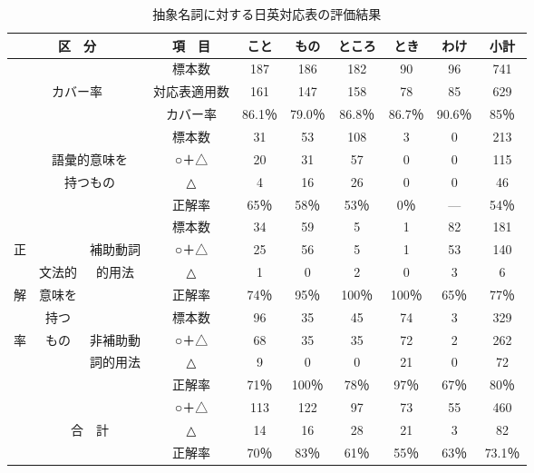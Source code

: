 \begin{table}[htbp]
\caption{抽象名詞に対する日英対応表の評価結果}
\begin{center}
\begin{tabular}{|c|c|c|c|c|c|c|c|c|c|} \hline
\multicolumn{3}{|c|}{区　分} & 項　目 & こと & もの & ところ & とき & わけ
 & 小計\\ \hline
\multicolumn{3}{|c|}{} & 標本数 & 187 & 186 & 182 & 90 & 96 & 741\\ \cline{4-10}
\multicolumn{3}{|c|}{カバー率} & 対応表適用数 & 161 & 147 & 158 & 78 &
 85 & 629\\ \cline{4-10}
\multicolumn{3}{|c|}{} & カバー率 & 86.1％ & 79.0％ & 86.8％ & 86.7％ &
 90.6％ & 85％\\ \hline
 & \multicolumn{2}{|c|}{} & 標本数 & 31 & 53 & 108 & 3 & 0 & 213\\ \cline{4-10}
 & \multicolumn{2}{|c|}{語彙的意味を} & ○＋△ & 20 & 31 & 57 & 0 & 0 &
 115\\ \cline{4-10}
 & \multicolumn{2}{|c|}{持つもの} & △ & 4 & 16 & 26 & 0 & 0 & 46\\ \cline{4-10}
 & \multicolumn{2}{|c|}{} & 正解率 & 65％ & 58％ & 53％ & 0％ & --- & 54％
 \\ \cline{2-10}
 & & & 標本数 & 34 & 59 & 5 & 1 & 82 & 181\\ \cline{4-10}
正 & & 補助動詞 & ○＋△ & 25 & 56 & 5 & 1 & 53 & 140\\ \cline{4-10}
 & 文法的 & 的用法 & △ & 1 & 0 & 2 & 0 & 3 & 6\\ \cline{4-10}
解 & 意味を & & 正解率 & 74％ & 95％ & 100％ & 100％ & 65％ & 77％\\ \cline{3-10}
 & 持つ & & 標本数 & 96 & 35 & 45 & 74 & 3 & 329\\ \cline{4-10}
率 & もの & 非補助動 & ○＋△ & 68 & 35 & 35 & 72 & 2 & 262\\ \cline{4-10}
 & & 詞的用法 & △ & 9 & 0 & 0 & 21 & 0 & 72\\ \cline{4-10}
 & & & 正解率 & 71％ & 100％ & 78％ & 97％ & 67％ & 80％\\ \cline{2-10}
 & \multicolumn{2}{|c|}{} & ○＋△ & 113 & 122 & 97 & 73 & 55 & 460\\ \cline{4-10}
 & \multicolumn{2}{|c|}{合　計} & △ & 14 & 16 & 28 & 21 & 3 & 82\\ \cline{4-10}
 & \multicolumn{2}{|c|}{} & 正解率 & 70％ & 83％ & 61％ & 55％ & 63％ &
 73.1％\\ \hline
\end{tabular}
\end{center}
\end{table}

